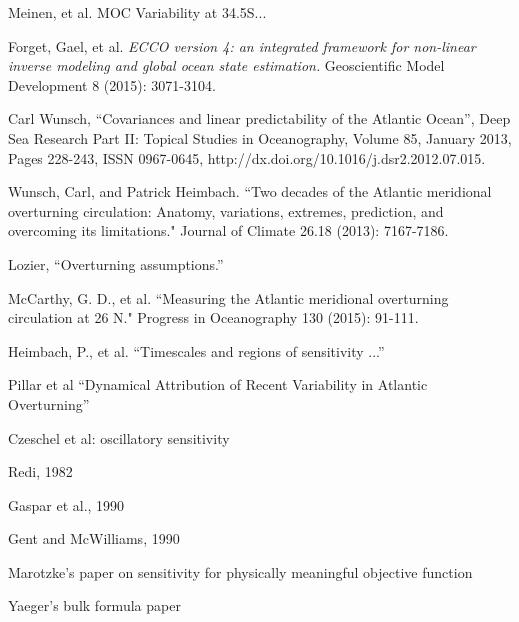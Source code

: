 \documentclass[a4paper,11pt]{article}
\begin{document}
  
\begin{thebibliography}{3}

  Meinen, et al. MOC Variability at 34.5S...
  
  Forget, Gael, et al. \textit{ECCO version 4: an integrated framework for non-linear inverse modeling and global ocean state estimation.} Geoscientific Model Development 8 (2015): 3071-3104.
  
  Carl Wunsch, ``Covariances and linear predictability of the Atlantic Ocean'', Deep Sea Research Part II: Topical Studies in Oceanography, Volume 85, January 2013, Pages 228-243, ISSN 0967-0645, http://dx.doi.org/10.1016/j.dsr2.2012.07.015.
  
  Wunsch, Carl, and Patrick Heimbach. ``Two decades of the Atlantic meridional overturning circulation: Anatomy, variations, extremes, prediction, and overcoming its limitations." Journal of Climate 26.18 (2013): 7167-7186.
  
  Lozier, ``Overturning assumptions.'' 

  McCarthy, G. D., et al. ``Measuring the Atlantic meridional overturning circulation at 26 N." Progress in Oceanography 130 (2015): 91-111.

  Heimbach, P., et al. ``Timescales and regions of sensitivity ...''

  Pillar et al ``Dynamical Attribution of Recent Variability in Atlantic Overturning''

  Czeschel et al: oscillatory sensitivity 

  Redi, 1982

  Gaspar et al., 1990

  Gent and McWilliams, 1990

  Marotzke's paper on sensitivity for physically meaningful objective function

  Yaeger's bulk formula paper

\end{thebibliography}
\end{document}
